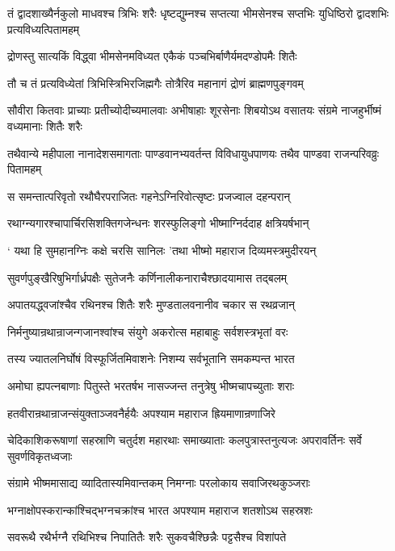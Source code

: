 \threelineshloka
{तं द्वादशाख्यैर्नकुलो माधवश्च त्रिभिः शरैः}
{धृष्टद्युम्नश्च सप्तत्या भीमसेनश्च सप्तभिः}
{युधिष्ठिरो द्वादशभिः प्रत्यविध्यत्पितामहम्}


\twolineshloka
{द्रोणस्तु सात्यकिं विद्ध्वा भीमसेनमविध्यत}
{एकैकं पञ्चभिर्बाणैर्यमदण्डोपमैः शितैः}


\twolineshloka
{तौ च तं प्रत्यविध्येतां त्रिभिस्त्रिभिरजिह्मगैः}
{तोत्रैरिव महानागं द्रोणं ब्राह्मणपुङ्गवम्}


\threelineshloka
{सौवीरा कितवाः प्राच्याः प्रतीच्योदीच्यमालवाः}
{अभीषाहाः शूरसेनाः शिबयोऽथ वसातयः}
{संग्रमे नाजहुर्भीष्मं वध्यमानाः शितैः शरैः}


\threelineshloka
{तथैवान्ये महीपाला नानादेशसमागताः}
{पाण्डवानभ्यवर्तन्त विविधायुधपाणयः}
{तथैव पाण्डवा राजन्परिवव्रुः पितामहम्}


\twolineshloka
{स समन्तात्परिवृतो रथौघैरपराजितः}
{गहनेऽग्निरिवोत्सृष्टः प्रजज्वाल दहन्परान्}


\twolineshloka
{रथाग्न्यगारश्चापार्चिरसिशक्तिगजेन्धनः}
{शरस्फुलिङ्गो भीष्माग्निर्ददाह क्षत्रियर्षभान्}


\twolineshloka
{` यथा हि सुमहानग्निः कक्षे चरसि सानिलः}
{'तथा भीष्मो महाराज दिव्यमस्त्रमुदीरयन्}


\twolineshloka
{सुवर्णपुङ्खैरिषुभिर्गार्ध्रपक्षैः सुतेजनैः}
{कर्णिनालीकनाराचैश्छादयामास तद्बलम्}


\twolineshloka
{अपातयद्ध्वजांश्चैव रथिनश्च शितैः शरैः}
{मुण्डतालवनानीव चकार स रथव्रजान्}


\twolineshloka
{निर्मनुष्यान्रथान्राजन्गजानश्वांश्च संयुगे}
{अकरोत्स महाबाहुः सर्वशस्त्रभृतां वरः}


\twolineshloka
{तस्य ज्यातलनिर्घोषं विस्फूर्जितमिवाशनेः}
{निशम्य सर्वभूतानि समकम्पन्त भारत}


\twolineshloka
{अमोघा ह्यपत्नबाणाः पितुस्ते भरतर्षभ}
{नासज्जन्त तनुत्रेषु भीष्मचापच्युताः शराः}


\twolineshloka
{हतवीरान्रथान्राजन्संयुक्ताञ्जवनैर्हयैः}
{अपश्याम महाराज ह्रियमाणान्रणाजिरे}


\threelineshloka
{चेदिकाशिकरूषाणां सहस्राणि चतुर्दश}
{महारथाः समाख्याताः कलपुत्रास्तनुत्यजः}
{अपरावर्तिनः सर्वे सुवर्णविकृतध्वजाः}


\twolineshloka
{संग्रामे भीष्ममासाद्य व्यादितास्यमिवान्तकम्}
{निमग्नाः परलोकाय सवाजिरथकुञ्जराः}


\twolineshloka
{भग्नाक्षोपस्करान्कांश्चिद्भग्नचक्रांश्च भारत}
{अपश्याम महाराज शतशोऽथ सहस्रशः}


\twolineshloka
{सवरूथै रथैर्भग्नै रथिभिश्च निपातितैः}
{शरैः सुकवचैश्छिन्नैः पट्टसैश्च विशांपते}


